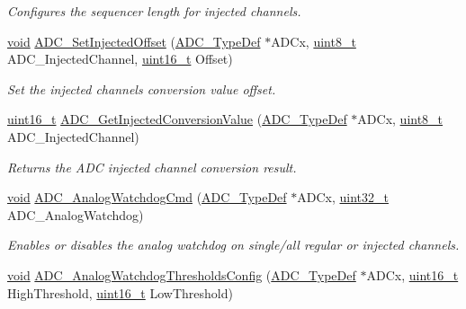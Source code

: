 \begin{DoxyCompactItemize}
\begin{DoxyCompactList}\small\item\em Configures the sequencer length for injected channels. \end{DoxyCompactList}\item 
\hyperlink{usb__devapi_8h_afabf60e7f57651d6d595a02c75f07cd0}{void} \hyperlink{group___a_d_c___private___functions_ga07a942613088ab3ecfc3d97a20475920}{A\+D\+C\+\_\+\+Set\+Injected\+Offset} (\hyperlink{struct_a_d_c___type_def}{A\+D\+C\+\_\+\+Type\+Def} $\ast$A\+D\+Cx, \hyperlink{_p_e___types_8h_aba7bc1797add20fe3efdf37ced1182c5}{uint8\+\_\+t} A\+D\+C\+\_\+\+Injected\+Channel, \hyperlink{_p_e___types_8h_a1f1825b69244eb3ad2c7165ddc99c956}{uint16\+\_\+t} Offset)
\begin{DoxyCompactList}\small\item\em Set the injected channels conversion value offset. \end{DoxyCompactList}\item 
\hyperlink{_p_e___types_8h_a1f1825b69244eb3ad2c7165ddc99c956}{uint16\+\_\+t} \hyperlink{group___a_d_c___private___functions_ga1dea5ed24571a2e0ce4cbd41c9c1ec46}{A\+D\+C\+\_\+\+Get\+Injected\+Conversion\+Value} (\hyperlink{struct_a_d_c___type_def}{A\+D\+C\+\_\+\+Type\+Def} $\ast$A\+D\+Cx, \hyperlink{_p_e___types_8h_aba7bc1797add20fe3efdf37ced1182c5}{uint8\+\_\+t} A\+D\+C\+\_\+\+Injected\+Channel)
\begin{DoxyCompactList}\small\item\em Returns the A\+DC injected channel conversion result. \end{DoxyCompactList}\item 
\hyperlink{usb__devapi_8h_afabf60e7f57651d6d595a02c75f07cd0}{void} \hyperlink{group___a_d_c___private___functions_gad017d69bec6e497afd35ba25ea22d86e}{A\+D\+C\+\_\+\+Analog\+Watchdog\+Cmd} (\hyperlink{struct_a_d_c___type_def}{A\+D\+C\+\_\+\+Type\+Def} $\ast$A\+D\+Cx, \hyperlink{_p_e___types_8h_a33594304e786b158f3fb30289278f5af}{uint32\+\_\+t} A\+D\+C\+\_\+\+Analog\+Watchdog)
\begin{DoxyCompactList}\small\item\em Enables or disables the analog watchdog on single/all regular or injected channels. \end{DoxyCompactList}\item 
\hyperlink{usb__devapi_8h_afabf60e7f57651d6d595a02c75f07cd0}{void} \hyperlink{group___a_d_c___private___functions_ga79588d02aa8e4147f21cb90a4708366d}{A\+D\+C\+\_\+\+Analog\+Watchdog\+Thresholds\+Config} (\hyperlink{struct_a_d_c___type_def}{A\+D\+C\+\_\+\+Type\+Def} $\ast$A\+D\+Cx, \hyperlink{_p_e___types_8h_a1f1825b69244eb3ad2c7165ddc99c956}{uint16\+\_\+t} High\+Threshold, \hyperlink{_p_e___types_8h_a1f1825b69244eb3ad2c7165ddc99c956}{uint16\+\_\+t} Low\+Threshold)

\end{DoxyCompactItemize}
